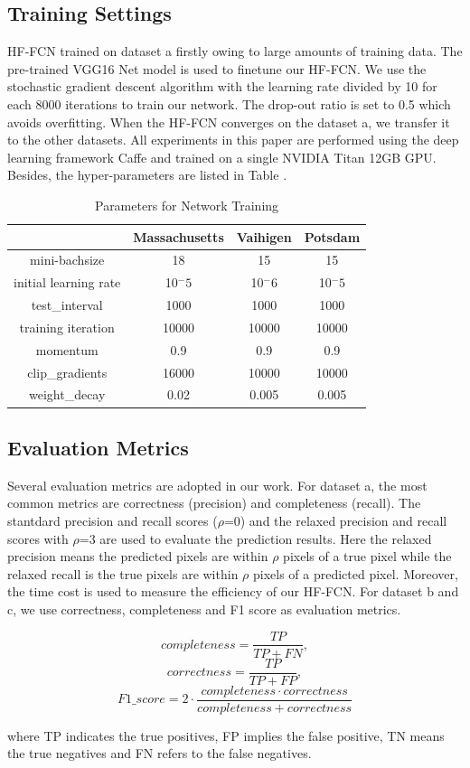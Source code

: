 \subsection{Training Settings}
HF-FCN trained on dataset a firstly owing to large amounts of training data. The pre-trained VGG16 Net model is used to finetune our HF-FCN. We use the stochastic gradient descent algorithm with the learning rate divided by 10 for each 8000 iterations to train our network. The drop-out ratio is set to 0.5 which avoids overfitting. When the HF-FCN converges on the dataset a, we transfer it to the other datasets. All experiments in this paper are performed using the deep learning framework Caffe and trained on a single NVIDIA Titan 12GB GPU. Besides, the hyper-parameters are listed in Table .
\begin{table}
\centering
\caption {Parameters for Network Training}
\begin{tabular}{c|c|c|c}
\hline
&Massachusetts &Vaihigen &Potsdam\\  \hline
mini-bachsize &18& 15 &15 \\
initial learning rate &10$^-5$ & 10$^-6$ &10$^-5$\\
test\_interval&1000 & 1000 &1000\\
training iteration &10000 & 10000& 10000\\
momentum&0.9 &0.9 &0.9\\
clip\_gradients &16000& 10000 &10000\\
weight\_decay&0.02& 0.005 &0.005\\ \hline
\end{tabular}
\end{table}

\subsection{Evaluation Metrics}
Several evaluation metrics are adopted in our work. For dataset a, the most common metrics are correctness (precision) and completeness (recall). The stantdard precision and recall scores ($\rho$=0) and the relaxed precision and recall scores with $\rho$=3 are used to evaluate the prediction results. Here the relaxed precision means the predicted pixels are within $\rho$ pixels of a true pixel while the relaxed recall is the true pixels are within $\rho$ pixels of a predicted pixel. Moreover, the time cost is used to measure the efficiency of our HF-FCN. For dataset b and c, we use correctness, completeness and F1 score as evaluation metrics. \par
\begin{equation}
 {completeness} = \frac{TP}{TP+FN},
\end{equation}
\begin{equation}
{correctness} = \frac{TP}{TP+FP},
\end{equation}
\begin{equation}
{F1\_score}= 2\cdot\frac{completeness\cdot correctness}{completeness+correctness}
\end{equation}

where TP indicates the true positives, FP implies the false positive, TN means the true negatives and FN refers to the false negatives.
